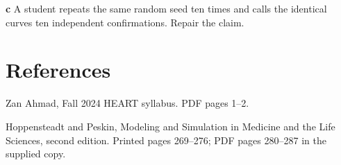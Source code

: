 \documentclass[11pt,letterpaper]{article}
\theoremstyle{definition}\newtheorem{definition}{Definition}\newtheorem{example}{Example}
\numberwithin{equation}{section}
\begin{document}
\textbf{c} A student repeats the same random seed ten times and calls the identical curves ten independent confirmations. Repair the claim.

\section*{References}
\noindent\begin{minipage}{\linewidth}
Zan Ahmad, Fall 2024 HEART syllabus. PDF pages 1--2.

\end{minipage}\par\medskip
\noindent\begin{minipage}{\linewidth}
Hoppensteadt and Peskin, Modeling and Simulation in Medicine and the Life Sciences, second edition. Printed pages 269--276; PDF pages 280--287 in the supplied copy.

\end{minipage}\par\medskip
\end{document}
